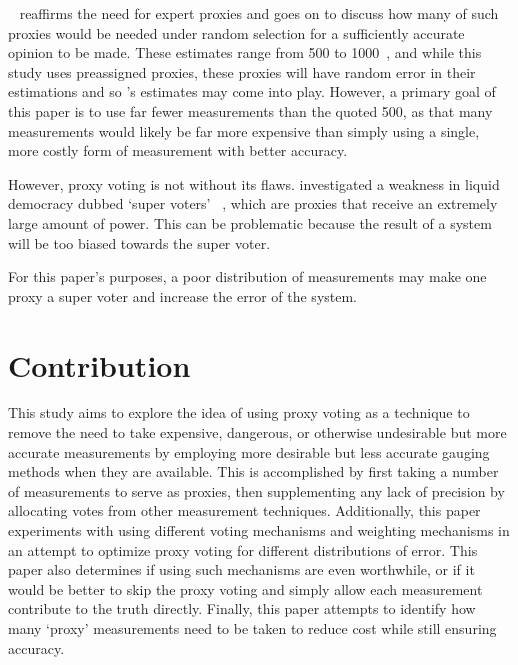 ~\cite{Mueller1972} reaffirms the need for expert proxies and
goes on to discuss how many of such proxies would be needed under random
selection for a sufficiently accurate opinion to be made.
These estimates range from 500 to 1000~\cite[para.~3.2]{Mueller1972}, and
while this study uses preassigned proxies, these proxies will have random
error in their estimations and so 's estimates may come into
play.
However, a primary goal of this paper is to use far fewer measurements than the
quoted 500, as that many measurements would likely be far more expensive than
simply using a single, more costly form of measurement with better accuracy.

However, proxy voting is not without its flaws.
 investigated a weakness in liquid democracy dubbed `super voters'
~\cite[para.~1.3]{Golz2021}, which are proxies that receive an extremely large
amount of power.
This can be problematic because the result of a system will be too biased
towards the super voter.  

For this paper's purposes, a poor distribution of measurements may make one
proxy a super voter and increase the error of the system.


\section{Contribution}\label{sec:contribution}
This study aims to explore the idea of using proxy voting as a technique to remove the
need to take expensive, dangerous, or otherwise undesirable but more accurate
measurements by employing more desirable but less accurate gauging methods when they
are available.
This is accomplished by first taking a number of measurements to serve as proxies, then
supplementing any lack of precision by allocating votes from other measurement
techniques.
Additionally, this paper experiments with using different voting mechanisms and
weighting mechanisms in an attempt to optimize proxy voting for different
distributions of error.
This paper also determines if using such mechanisms are even worthwhile, or if it
would be better to skip the proxy voting and simply allow each measurement contribute
to the truth directly.
Finally, this paper attempts to identify how many `proxy' measurements need
to be taken to reduce cost while still ensuring accuracy.

